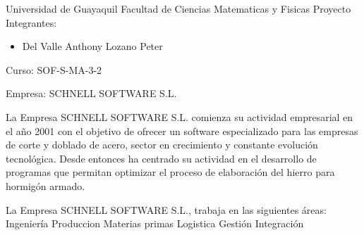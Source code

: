 \begin{center}
Universidad de Guayaquil
Facultad de Ciencias Matematicas y Fisicas
Proyecto
Integrantes:
\begin{itemize}
	\item Del Valle Anthony
Lozano Peter
\end{itemize}
Curso: SOF-S-MA-3-2
\end{center}

Empresa: SCHNELL SOFTWARE S.L.


La Empresa SCHNELL SOFTWARE S.L. comienza su actividad empresarial en el año 2001 con el objetivo de ofrecer un software especializado para las empresas de corte y doblado de acero, sector en crecimiento y constante evolución tecnológica. Desde entonces ha centrado su actividad en el desarrollo de programas que permitan optimizar el proceso de elaboración del hierro para hormigón armado.

La Empresa SCHNELL SOFTWARE S.L., trabaja en las siguientes áreas:
Ingeniería
Produccion
Materias primas
Logistica
Gestión
Integración